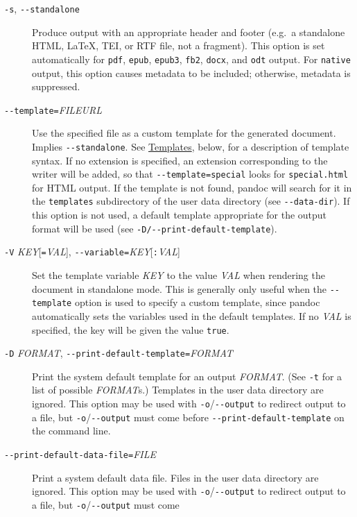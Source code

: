 \begin{description}
\item[\texttt{-s}, \texttt{-\/-standalone}]
Produce output with an appropriate header and footer (e.g.~a standalone
HTML, LaTeX, TEI, or RTF file, not a fragment). This option is set
automatically for \texttt{pdf}, \texttt{epub}, \texttt{epub3},
\texttt{fb2}, \texttt{docx}, and \texttt{odt} output. For
\texttt{native} output, this option causes metadata to be included;
otherwise, metadata is suppressed.
\item[\texttt{-\/-template=}\emph{FILE}\textbar{}\emph{URL}]
Use the specified file as a custom template for the generated document.
Implies \texttt{-\/-standalone}. See
\protect\hyperlink{templates}{Templates}, below, for a description of
template syntax. If no extension is specified, an extension
corresponding to the writer will be added, so that
\texttt{-\/-template=special} looks for \texttt{special.html} for HTML
output. If the template is not found, pandoc will search for it in the
\texttt{templates} subdirectory of the user data directory (see
\texttt{-\/-data-dir}). If this option is not used, a default template
appropriate for the output format will be used (see
\texttt{-D/-\/-print-default-template}).
\item[\texttt{-V} \emph{KEY}{[}\texttt{=}\emph{VAL}{]},
\texttt{-\/-variable=}\emph{KEY}{[}\texttt{:}\emph{VAL}{]}]
Set the template variable \emph{KEY} to the value \emph{VAL} when
rendering the document in standalone mode. This is generally only useful
when the \texttt{-\/-template} option is used to specify a custom
template, since pandoc automatically sets the variables used in the
default templates. If no \emph{VAL} is specified, the key will be given
the value \texttt{true}.
\item[\texttt{-D} \emph{FORMAT},
\texttt{-\/-print-default-template=}\emph{FORMAT}]
Print the system default template for an output \emph{FORMAT}. (See
\texttt{-t} for a list of possible \emph{FORMAT}s.) Templates in the
user data directory are ignored. This option may be used with
\texttt{-o}/\texttt{-\/-output} to redirect output to a file, but
\texttt{-o}/\texttt{-\/-output} must come before
\texttt{-\/-print-default-template} on the command line.
\item[\texttt{-\/-print-default-data-file=}\emph{FILE}]
Print a system default data file. Files in the user data directory are
ignored. This option may be used with \texttt{-o}/\texttt{-\/-output} to
redirect output to a file, but \texttt{-o}/\texttt{-\/-output} must come

\end{description}
